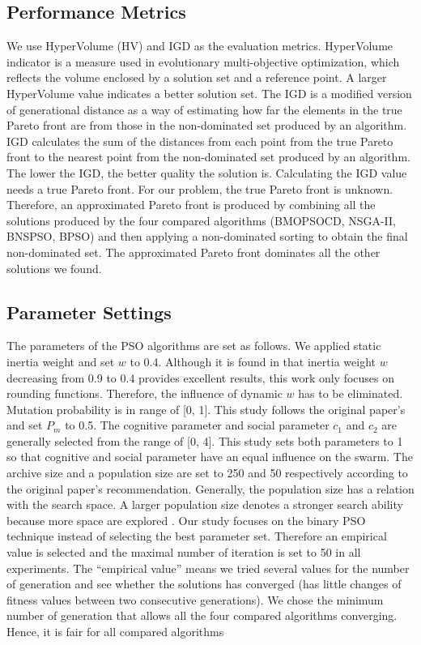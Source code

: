 \documentclass[10pt,journal,compsoc]{IEEEtran}
\begin{document}
\subsection{Performance Metrics}
\label{sec:metrics}
We use HyperVolume (HV) and IGD as the evaluation metrics. HyperVolume indicator \cite{Zitzler1998, 7360024} is a measure used in evolutionary multi-objective optimization, which reflects the volume enclosed by a solution set and a reference point. A larger HyperVolume value indicates a better solution set. The IGD \cite{1501598} is a modified version of generational distance \cite{veldhuizen99} as a way of estimating how far the elements in the true Pareto front are from those in the non-dominated set produced by an algorithm. IGD calculates the sum of the distances from each point from the true Pareto front to the nearest point from the non-dominated set produced by an algorithm. The lower the IGD, the better quality the solution is. Calculating the IGD value needs a true Pareto front. For our problem, the true Pareto front is unknown. Therefore, an approximated Pareto front is produced by combining all the solutions produced by the four compared algorithms (BMOPSOCD, NSGA-II, BNSPSO, BPSO) and then applying a non-dominated sorting to obtain the final non-dominated set. The approximated Pareto front dominates all the other solutions we found.



\subsection{Parameter Settings}
\label{sec:parameters}
The parameters of the PSO algorithms are set as follows. We applied static inertia weight and set $w$ to 0.4. Although it is found in \cite{xin2009particle} that inertia weight $w$ decreasing from 0.9 to 0.4 provides excellent results, this work only focuses on rounding functions. Therefore, the influence of dynamic $w$ has to be eliminated. Mutation probability is in range of [0, 1]. This study follows the original paper's \cite{Raquel} and set $P_m$ to 0.5. The cognitive parameter and social parameter $c_1$ and $c_2$ are generally selected from the range of [0, 4]. This study sets both parameters to 1 \cite{Raquel} so that cognitive and social parameter have an equal influence on the swarm. The archive size and a population size are set to 250 and 50 respectively according to the original paper's \cite{Raquel} recommendation. Generally, the population size has a relation with the search space. A larger population size denotes a stronger search ability because 
more space are explored \cite{qi1994theoretical}.
Our study focuses on the binary PSO technique instead of selecting the best parameter set. Therefore an empirical value is selected and the maximal number of iteration is set to 50 in all experiments. 
The ``empirical value'' means we tried several values for the number of generation and see whether the solutions has converged (has little changes of fitness values between two consecutive generations). 
We chose the minimum number of generation that allows all the four compared algorithms converging. Hence, it is fair for all compared algorithms
\end{document}
